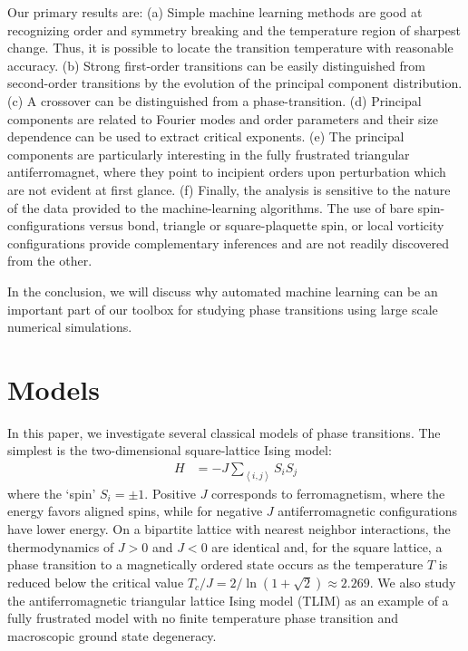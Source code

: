 \documentclass[pra,letterpaper,10pt,twocolumn]{revtex4}
\begin{document}
Our primary results are: (a) Simple machine learning methods are good at
recognizing order and symmetry breaking and the temperature region of
sharpest change. Thus, it is possible to locate the transition
temperature with reasonable accuracy.  (b) Strong first-order
transitions can be easily distinguished from second-order transitions by
the evolution of the principal component distribution.  (c) A crossover
can be distinguished from a phase-transition. (d) Principal components
are related to Fourier modes and order parameters and their size
dependence can be used to extract critical exponents.  (e) The principal
components are particularly interesting in the fully frustrated
triangular antiferromagnet, where they point to incipient orders upon
perturbation which are not evident at first glance.  
(f) Finally, the analysis is sensitive to the nature of the data provided to
the machine-learning algorithms. The use of bare spin-configurations
versus bond, triangle or square-plaquette spin, or local vorticity
configurations provide complementary inferences and are not readily
discovered from the other.

In the conclusion, we will discuss why automated machine learning can be
an important part of our toolbox for studying phase transitions using
large scale numerical simulations.


\section{Models}



In this paper, we investigate several classical models of 
phase transitions.  The simplest is the two-dimensional
square-lattice Ising model:
\begin{align}
H &= -J\sum_{\left\langle i,j \right\rangle} S_iS_j
\label{eq:ham_Ising}
\end{align}
where the `spin' $S_i=\pm 1$.  Positive $J$ corresponds to
ferromagnetism, where the energy favors aligned spins, while for
negative $J$ antiferromagnetic configurations have lower energy.  On a
bipartite lattice with nearest neighbor interactions, 
the thermodynamics of $J>0$ and $J<0$ are identical and, for the square
lattice, a phase transition to a magnetically ordered state occurs as
the temperature $T$ is reduced below the critical value $T_c/J = 2/\ln(1
+ \sqrt{2}) \approx 2.269$\cite{Onsager}.  We also study the
antiferromagnetic triangular lattice Ising model (TLIM) as an example of
a fully frustrated model with no finite temperature phase transition and
macroscopic ground state degeneracy.
\end{document}
